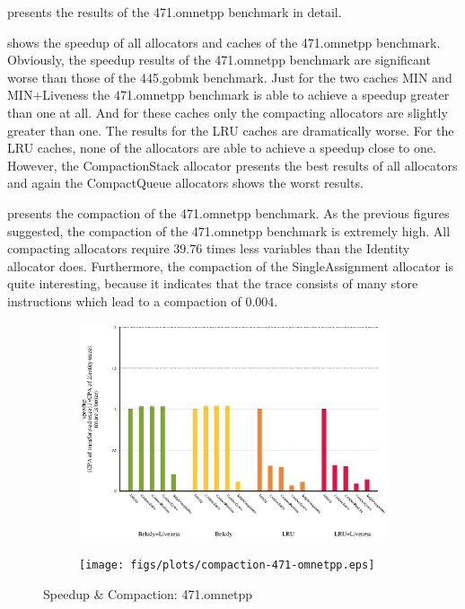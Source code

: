 \documentclass[onecolumn, openright, master, english, signatures]{dbrgrptt}
\begin{document}
 presents the results of the 471.omnetpp benchmark in detail.

 shows the speedup of all allocators and caches of the 471.omnetpp benchmark.
Obviously, the speedup results of the 471.omnetpp benchmark are significant worse than those of the 445.gobmk benchmark.
Just for the two caches \ac{MIN} and \ac{MIN}+Liveness the 471.omnetpp benchmark is able to achieve a speedup greater than one at all.
And for these caches only the compacting allocators are slightly greater than one.
The results for the \ac{LRU} caches are dramatically worse.
For the \ac{LRU} caches, none of the allocators are able to achieve a speedup close to one.
However, the CompactionStack allocator presents the best results of all allocators and again the CompactQueue allocators shows the worst results.

 presents the compaction of the 471.omnetpp benchmark.
As the previous figures suggested, the compaction of the 471.omnetpp benchmark is extremely high.
All compacting allocators require $39.76$ times less variables than the Identity allocator does.
Furthermore, the compaction of the SingleAssignment allocator is quite interesting, because it indicates that the \ac{trace} consists of many store instructions which lead to a compaction of $0.004$.

\begin{figure}[!ht]
  \begin{subfigure}[b]{0.5\textwidth}%
    \includegraphics[width=\textwidth]{figs/plots/speedup-471-omnetpp.eps}
    \label{fig:speedup-compaction-471-omnetpp-speedup}
  \end{subfigure}%
  \begin{subfigure}[b]{0.5\textwidth}%
    \texttt{[image: figs/plots/compaction-471-omnetpp.eps]}
    \label{fig:speedup-compaction-471-omnetpp-compaction}
  \end{subfigure}%
  \caption{Speedup \& Compaction: 471.omnetpp}
  \label{fig:speedup-compaction-471-omnetpp}
\end{figure}
\end{document}
